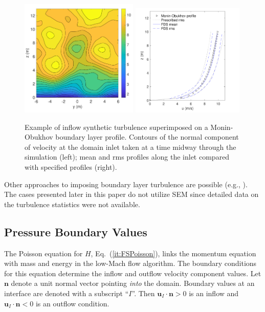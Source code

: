 \documentclass[journal,article,atmosphere,submit,moreauthors,pdftex]{Definitions/mdpi}
\begin{document}
\begin{figure}[ht]
\centering
\includegraphics[width=0.5\textwidth,valign=c]{figures/sem_open_wind_contours.pdf}
\includegraphics[width=0.48\textwidth,valign=c]{figures/sem_open_wind_u_prof.pdf}
\caption{Example of inflow synthetic turbulence superimposed on a Monin-Obukhov boundary layer profile. Contours of the normal component of velocity at the domain inlet taken at a time midway through the simulation (left); mean and rms profiles along the inlet compared with specified profiles (right).}
\label{fig:semprofs}
\end{figure}

Other approaches to imposing boundary layer turbulence are possible (e.g., \cite{Munoz-Esparza:2014}).  The cases presented later in this paper do not utilize SEM since detailed data on the turbulence statistics were not available.

\subsection{Pressure Boundary Values}

The Poisson equation for $H$, Eq.~(\ref{it:FSPoisson}), links the momentum equation with mass and energy in the low-Mach flow algorithm.  The boundary conditions for this equation determine the inflow and outflow velocity component values.  Let $\mathbf{n}$ denote a unit normal vector pointing \emph{into} the domain.  Boundary values at an interface are denoted with a subscript ``$I$''.  Then $\mathbf{u}_I\cdot\mathbf{n}>0$ is an inflow and $\mathbf{u}_I\cdot\mathbf{n}<0$ is an outflow condition.
\end{document}
